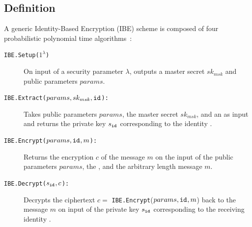 \subsection{Definition}
A generic Identity-Based Encryption (IBE) scheme is composed of four probabilistic polynomial time algorithms~\cite{art:BonehF01}:
\begin{description}
    \item[\texttt{IBE.Setup($1^{\lambda}$)}] On input of a security parameter $\lambda$, outputs a master secret $sk_{msk}$ and public parameters $params$.
    \item[\texttt{IBE.Extract($params, sk_{msk}, \mathtt{id}_{}$):}] Takes public parameters $params$, the master secret $sk_{msk}$, and an \id{} as input and returns the private key $s_{\mathtt{id}_{}}$ corresponding to the identity \id{}.
    \item[\texttt{IBE.Encrypt($params, \mathtt{id}_{}, m$):}] Returns the encryption $c$ of the message $m$ on the input of the public parameters $params$, the \id{}, and the arbitrary length message $m$.
    \item[\texttt{IBE.Decrypt($s_{\mathtt{id}_{}}, c$):}] Decrypts the ciphertext $c =$ \texttt{IBE.Encrypt}($params, \mathtt{id}_{}, m$) back to the message $m$ on input of the private key $s_{\mathtt{id}_{}}$ corresponding to the receiving identity \id{}.
\end{description}


